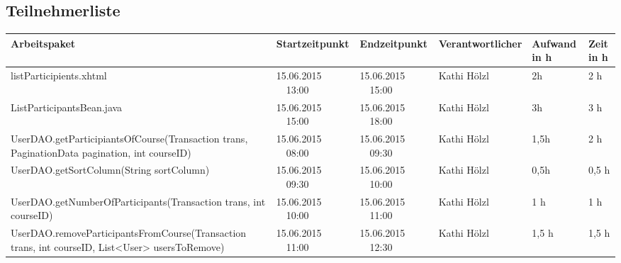 \begin{landscape}
	\subsection{Teilnehmerliste}
	\begin{tabular}{|p{10.3cm}|p{3.2cm}|p{3.2cm}|p{3.5cm}|p{1.7cm}|p{1.5cm}|}
		\hline  \textbf{Arbeitspaket} & \textbf{Startzeitpunkt} & \textbf{Endzeitpunkt} & \textbf{Verantwortlicher}  & \textbf{Aufwand in h} & \textbf{Zeit in h}\\ 
		\hline   listParticipients.xhtml                                    & 15.06.2015 \ \ 13:00     & 15.06.2015 \ \ 15:00     & Kathi Hölzl & 2h               & 2 h \\
		\hline   ListParticipantsBean.java                                  & 15.06.2015 \ \ 15:00     & 15.06.2015 \ \ 18:00     & Kathi Hölzl  &      3h      &     3 h     \\
		\hline   UserDAO.getParticipiantsOfCourse(Transaction trans, PaginationData pagination, int courseID)  & 15.06.2015 \ \ 08:00     & 15.06.2015 \ \ 09:30              & Kathi Hölzl  &      1,5h   &     2 h \\
		\hline   UserDAO.getSortColumn(String sortColumn)  & 15.06.2015 \ \ 09:30     & 15.06.2015 \ \ 10:00              & Kathi Hölzl  &      0,5h   &     0,5 h \\
		\hline   UserDAO.getNumberOfParticipants(Transaction trans, int courseID)  & 15.06.2015 \ \ 10:00     & 15.06.2015 \ \ 11:00              & Kathi Hölzl  &      1 h   &     1 h \\
		\hline   UserDAO.removeParticipantsFromCourse(Transaction trans, int courseID, List<User> usersToRemove)  & 15.06.2015 \ \ 11:00     & 15.06.2015 \ \ 12:30              & Kathi Hölzl  &      1,5 h   &     1,5 h \\
		\hline 
	\end{tabular} \ \\
	\ \\
	

\end{landscape}
